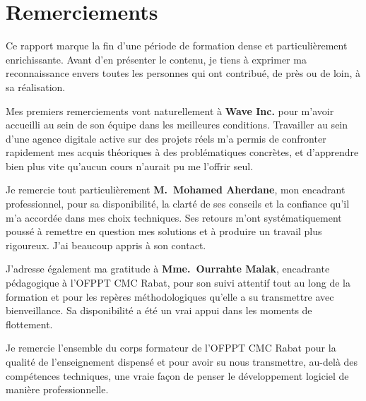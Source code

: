 \documentclass[12pt, a4paper]{report}
\newcommand{\ofppt}{\textsc{OFPPT}}
\begin{document}
\cleardoublepage

\chapter*{Remerciements}

\vspace*{0.5cm}

Ce rapport marque la fin d'une période de formation dense et
particulièrement enrichissante. Avant d'en présenter le contenu, je
tiens à exprimer ma reconnaissance envers toutes les personnes qui ont
contribué, de près ou de loin, à sa réalisation.

\vspace{0.6cm}

Mes premiers remerciements vont naturellement à \textbf{Wave Inc.} pour
m'avoir accueilli au sein de son équipe dans les meilleures conditions.
Travailler au sein d'une agence digitale active sur des projets réels
m'a permis de confronter rapidement mes acquis théoriques à des
problématiques concrètes, et d'apprendre bien plus vite qu'aucun cours
n'aurait pu me l'offrir seul.

\vspace{0.6cm}

Je remercie tout particulièrement \textbf{M.~Mohamed Aherdane},
mon encadrant professionnel, pour sa disponibilité, la clarté de ses
conseils et la confiance qu'il m'a accordée dans mes choix techniques.
Ses retours m'ont systématiquement poussé à remettre en question mes
solutions et à produire un travail plus rigoureux. J'ai beaucoup appris
à son contact.

\vspace{0.6cm}

J'adresse également ma gratitude à \textbf{Mme.~Ourrahte Malak},
encadrante pédagogique à l'\ofppt{} CMC Rabat, pour son suivi attentif
tout au long de la formation et pour les repères méthodologiques qu'elle
a su transmettre avec bienveillance. Sa disponibilité a été un vrai
appui dans les moments de flottement.

\vspace{0.6cm}

Je remercie l'ensemble du corps formateur de l'\ofppt{} CMC Rabat pour
la qualité de l'enseignement dispensé et pour avoir su nous transmettre,
au-delà des compétences techniques, une vraie façon de penser le
développement logiciel de manière professionnelle.
\end{document}

